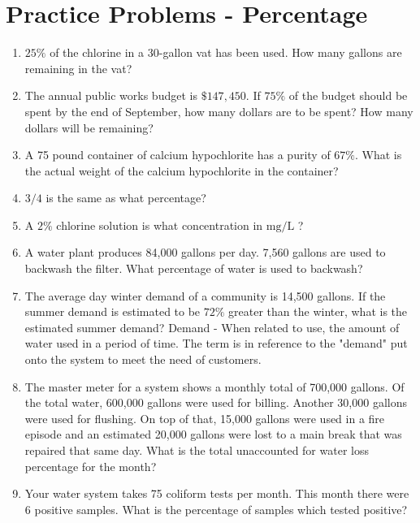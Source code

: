 \section*{Practice Problems - Percentage}
\begin{enumerate}
\item $25 \%$ of the chlorine in a 30-gallon vat has been used. How many gallons are remaining in the vat?\\

\item The annual public works budget is $\$ 147,450$. If $75 \%$ of the budget should be spent by the end of September, how many dollars are to be spent? How many dollars will be remaining?

\item A 75 pound container of calcium hypochlorite has a purity of $67 \%$. What is the actual weight of the calcium hypochlorite in the container? \\

\item $3 / 4$ is the same as what percentage?

\item A $2 \%$ chlorine solution is what concentration in $\mathrm{mg} / \mathrm{L}$ ?

\item A water plant produces 84,000 gallons per day. 7,560 gallons are used to backwash the filter. What percentage of water is used to backwash?

\item The average day winter demand of a community is 14,500 gallons. If the summer demand is estimated to be $72 \%$ greater than the winter, what is the estimated summer demand? Demand - When related to use, the amount of water used in a period of time. The term is in reference to the "demand" put onto the system to meet the need of customers.

\item The master meter for a system shows a monthly total of 700,000 gallons. Of the total water, 600,000 gallons were used for billing. Another 30,000 gallons were used for flushing. On top of that, 15,000 gallons were used in a fire episode and an estimated 20,000 gallons were lost to a main break that was repaired that same day. What is the total unaccounted for water loss percentage for the month?

\item Your water system takes 75 coliform tests per month. This month there were 6 positive samples. What is the percentage of samples which tested positive?
\end{enumerate}

